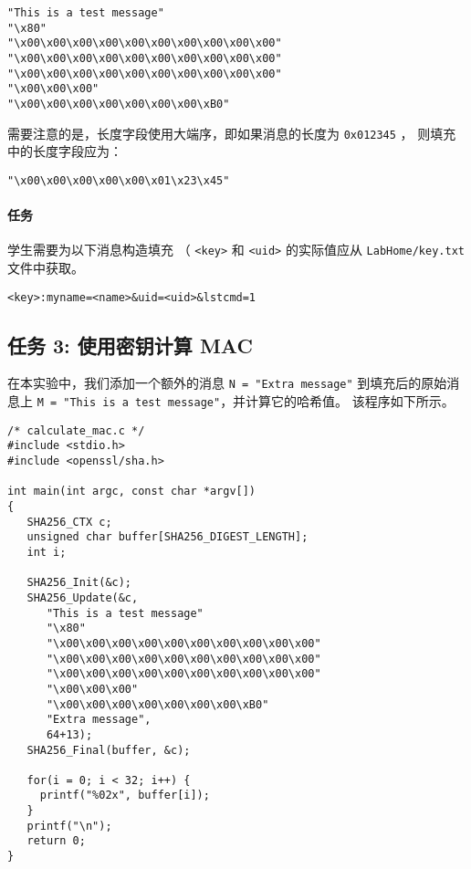 \begin{lstlisting}
"This is a test message"
"\x80"
"\x00\x00\x00\x00\x00\x00\x00\x00\x00\x00"
"\x00\x00\x00\x00\x00\x00\x00\x00\x00\x00"
"\x00\x00\x00\x00\x00\x00\x00\x00\x00\x00"
"\x00\x00\x00"
"\x00\x00\x00\x00\x00\x00\x00\xB0"
\end{lstlisting}


需要注意的是，长度字段使用大端序，即如果消息的长度为 \texttt{0x012345} ，
则填充中的长度字段应为：
\begin{lstlisting}
"\x00\x00\x00\x00\x00\x01\x23\x45"
\end{lstlisting}


\paragraph{任务}
学生需要为以下消息构造填充 （ \texttt{<key>} 和 \texttt{<uid>} 的实际值应从
\texttt{LabHome/key.txt} 文件中获取。

\begin{lstlisting}
<key>:myname=<name>&uid=<uid>&lstcmd=1
\end{lstlisting}



\subsection{任务 3: 使用密钥计算 MAC}

在本实验中，我们添加一个额外的消息 \texttt{N = "Extra message"}
到填充后的原始消息上 \texttt{M = "This is a test message"}，并计算它的哈希值。
该程序如下所示。

\begin{lstlisting}
/* calculate_mac.c */
#include <stdio.h>
#include <openssl/sha.h>

int main(int argc, const char *argv[])
{
   SHA256_CTX c;
   unsigned char buffer[SHA256_DIGEST_LENGTH];
   int i;

   SHA256_Init(&c);
   SHA256_Update(&c,
      "This is a test message"
      "\x80"
      "\x00\x00\x00\x00\x00\x00\x00\x00\x00\x00"
      "\x00\x00\x00\x00\x00\x00\x00\x00\x00\x00"
      "\x00\x00\x00\x00\x00\x00\x00\x00\x00\x00"
      "\x00\x00\x00"
      "\x00\x00\x00\x00\x00\x00\x00\xB0"
      "Extra message",
      64+13);
   SHA256_Final(buffer, &c);

   for(i = 0; i < 32; i++) {
     printf("%02x", buffer[i]);
   }
   printf("\n");
   return 0;
}
\end{lstlisting}

